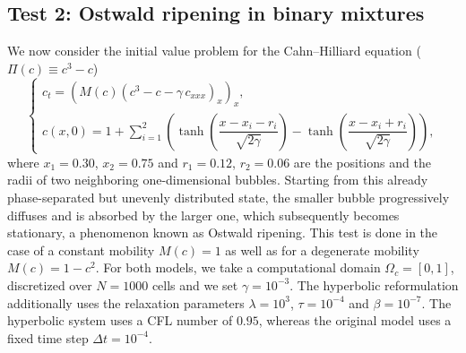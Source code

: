 \documentclass[11pt]{article}
\numberwithin{equation}{section}
\newtheorem{counter example}[theorem]{Counter Example}
\numberwithin{equation}{section}
\numberwithin{equation}{section}
\newcommand{\prn}[1]{\left( #1 \right)}
\begin{document}
\subsection{Test 2: Ostwald ripening in binary mixtures}\label{ssec:ostwald}
We now consider the initial value problem for the Cahn--Hilliard equation ($\Pi(c)\equiv c^3-c$)
\begin{equation}\label{eq:ch-ostwald}
	\begin{cases}
		c_t = \prn{M(c)\prn{c^3 - c- \gamma\, c_{xxx}}_x }_{x},\\[2pt]
		c(x,0) = 1 + \displaystyle\sum_{i=1}^{2}
		\prn{\tanh\prn{\dfrac{x-x_i-r_i}{\sqrt{2\gamma}}}
			-\tanh\prn{\dfrac{x-x_i+r_i}{\sqrt{2\gamma}}}},
	\end{cases}
\end{equation}
where $x_1=0.30$, $x_2=0.75$ and $r_1=0.12$, $r_2=0.06$ are the positions and
the radii of two neighboring one-dimensional bubbles. Starting from this already phase-separated but unevenly distributed state, the smaller bubble progressively diffuses and is absorbed by the larger one, which subsequently becomes stationary, a phenomenon known as Ostwald ripening. This test is done in the case of a constant mobility $M(c)=1$ as well as for a degenerate mobility $M(c)=1-c^2$.
For both models, we take a computational domain $\Omega_c = [0,1]$, discretized over $N=1000$ cells and we set $\gamma=10^{-3}$. The hyperbolic reformulation additionally
uses the relaxation parameters $\lambda=10^{3}$, $\tau=10^{-4}$ and
$\beta=10^{-7}$. The hyperbolic system uses a CFL number of $0.95$, whereas the original model uses a fixed time step $\Delta t=10^{-4}$.
\end{document}
